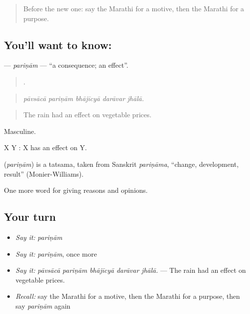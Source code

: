\label{lesson:MR-C342-parinam}



\begin{quote}
Before the new one: say the Marathi for a motive, then the Marathi for a purpose.
\end{quote}

\subsection*{You'll want to know: }
\textbf{} — \emph{pariṇām} — \textquotedblleft{}a consequence; an effect\textquotedblright{}.

\begin{quote}
    .
\end{quote}

\begin{quote}
\emph{pāvsācā pariṇām bhājīcyā darāvar jhālā.}
\end{quote}

\begin{quote}
The rain had an effect on vegetable prices.
\end{quote}

Masculine.

X   Y  : X has an effect on Y.

\begin{cousinweb}
\textbf{} (\emph{pariṇām}) is a tatsama, taken from Sanskrit \emph{pariṇāma}, \textquotedblleft{}change, development, result\textquotedblright{} (Monier-Williams).
\end{cousinweb}

\begin{grammarlens}[title={What you've built}]
One more word for giving reasons and opinions.
\end{grammarlens}

\subsection*{Your turn}
\begin{itemize}
\raggedright
  \item \emph{Say it:} \emph{pariṇām}
  \item \emph{Say it:} \emph{pariṇām}, once more
  \item \emph{Say it:} \emph{pāvsācā pariṇām bhājīcyā darāvar jhālā.} — The rain had an effect on vegetable prices.
  \item \emph{Recall:} say the Marathi for a motive, then the Marathi for a purpose, then say \emph{pariṇām} again
\end{itemize}

